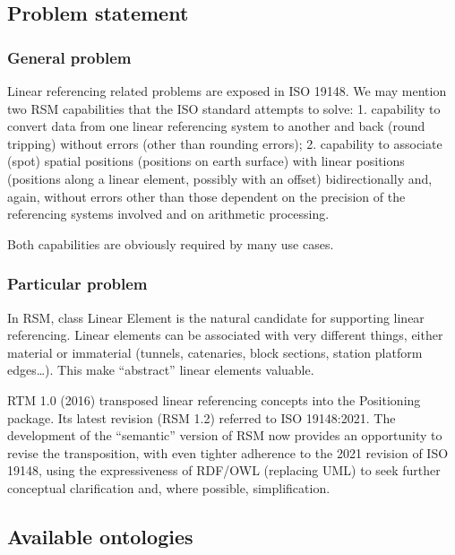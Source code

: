 \documentclass[
  11pt,
]{article}
\begin{document}
\hypertarget{problem-statement}{%
\subsection{Problem statement}\label{problem-statement}}

\hypertarget{general-problem}{%
\subsubsection{General problem}\label{general-problem}}

Linear referencing related problems are exposed in ISO 19148. We may
mention two RSM capabilities that the ISO standard attempts to solve: 1.
capability to convert data from one linear referencing system to another
and back (round tripping) without errors (other than rounding errors);
2. capability to associate (spot) spatial positions (positions on earth
surface) with linear positions (positions along a linear element,
possibly with an offset) bidirectionally and, again, without errors
other than those dependent on the precision of the referencing systems
involved and on arithmetic processing.

Both capabilities are obviously required by many use cases.

\hypertarget{particular-problem}{%
\subsubsection{Particular problem}\label{particular-problem}}

In RSM, class Linear Element is the natural candidate for supporting
linear referencing. Linear elements can be associated with very
different things, either material or immaterial (tunnels, catenaries,
block sections, station platform edges\ldots). This make ``abstract''
linear elements valuable.

RTM 1.0 (2016) transposed linear referencing concepts into the
Positioning package. Its latest revision (RSM 1.2) referred to ISO
19148:2021. The development of the ``semantic'' version of RSM now
provides an opportunity to revise the transposition, with even tighter
adherence to the 2021 revision of ISO 19148, using the expressiveness of
RDF/OWL (replacing UML) to seek further conceptual clarification and,
where possible, simplification.

\hypertarget{available-ontologies}{%
\subsection{Available ontologies}\label{available-ontologies}}
\end{document}
